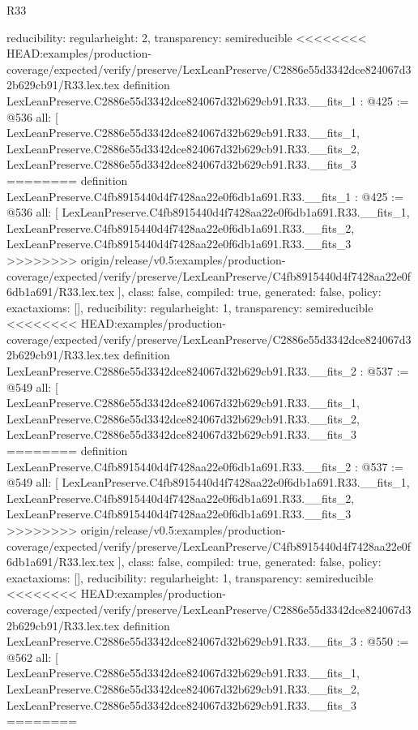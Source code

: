 \begin{lexlean}{R33}
\begin{coremodule}
{{{{{{{{{  reducibility: regular{height: 2},
  transparency: semireducible
}
<<<<<<<< HEAD:examples/production-coverage/expected/verify/preserve/LexLeanPreserve/C2886e55d3342dce824067d32b629cb91/R33.lex.tex
definition LexLeanPreserve.C2886e55d3342dce824067d32b629cb91.R33.__fits_1 : @425 := @536 {
  all: [
    LexLeanPreserve.C2886e55d3342dce824067d32b629cb91.R33.__fits_1,
    LexLeanPreserve.C2886e55d3342dce824067d32b629cb91.R33.__fits_2,
    LexLeanPreserve.C2886e55d3342dce824067d32b629cb91.R33.__fits_3
========
definition LexLeanPreserve.C4fb8915440d4f7428aa22e0f6db1a691.R33.__fits_1 : @425 := @536 {
  all: [
    LexLeanPreserve.C4fb8915440d4f7428aa22e0f6db1a691.R33.__fits_1,
    LexLeanPreserve.C4fb8915440d4f7428aa22e0f6db1a691.R33.__fits_2,
    LexLeanPreserve.C4fb8915440d4f7428aa22e0f6db1a691.R33.__fits_3
>>>>>>>> origin/release/v0.5:examples/production-coverage/expected/verify/preserve/LexLeanPreserve/C4fb8915440d4f7428aa22e0f6db1a691/R33.lex.tex
  ],
  class: false,
  compiled: true,
  generated: false,
  policy: exact{axioms: []},
  reducibility: regular{height: 1},
  transparency: semireducible
}
<<<<<<<< HEAD:examples/production-coverage/expected/verify/preserve/LexLeanPreserve/C2886e55d3342dce824067d32b629cb91/R33.lex.tex
definition LexLeanPreserve.C2886e55d3342dce824067d32b629cb91.R33.__fits_2 : @537 := @549 {
  all: [
    LexLeanPreserve.C2886e55d3342dce824067d32b629cb91.R33.__fits_1,
    LexLeanPreserve.C2886e55d3342dce824067d32b629cb91.R33.__fits_2,
    LexLeanPreserve.C2886e55d3342dce824067d32b629cb91.R33.__fits_3
========
definition LexLeanPreserve.C4fb8915440d4f7428aa22e0f6db1a691.R33.__fits_2 : @537 := @549 {
  all: [
    LexLeanPreserve.C4fb8915440d4f7428aa22e0f6db1a691.R33.__fits_1,
    LexLeanPreserve.C4fb8915440d4f7428aa22e0f6db1a691.R33.__fits_2,
    LexLeanPreserve.C4fb8915440d4f7428aa22e0f6db1a691.R33.__fits_3
>>>>>>>> origin/release/v0.5:examples/production-coverage/expected/verify/preserve/LexLeanPreserve/C4fb8915440d4f7428aa22e0f6db1a691/R33.lex.tex
  ],
  class: false,
  compiled: true,
  generated: false,
  policy: exact{axioms: []},
  reducibility: regular{height: 1},
  transparency: semireducible
}
<<<<<<<< HEAD:examples/production-coverage/expected/verify/preserve/LexLeanPreserve/C2886e55d3342dce824067d32b629cb91/R33.lex.tex
definition LexLeanPreserve.C2886e55d3342dce824067d32b629cb91.R33.__fits_3 : @550 := @562 {
  all: [
    LexLeanPreserve.C2886e55d3342dce824067d32b629cb91.R33.__fits_1,
    LexLeanPreserve.C2886e55d3342dce824067d32b629cb91.R33.__fits_2,
    LexLeanPreserve.C2886e55d3342dce824067d32b629cb91.R33.__fits_3
========
}}}}}}}}}}}
\end{coremodule}
\end{lexlean}
